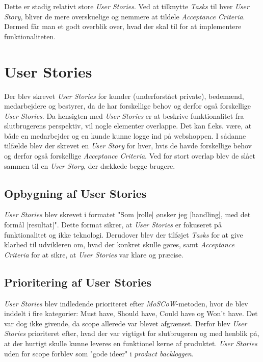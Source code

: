 Dette er stadig relativt store \emph{User Stories}. Ved at tilknytte \emph{Tasks} til hver \emph{User Story}, bliver de mere overskuelige og 
nemmere at tildele \emph{Acceptance Criteria}. Dermed får man et godt overblik over, hvad der skal til for at implementere funktionaliteten.

\section{User Stories}
Der blev skrevet \emph{User Stories} for kunder (underforstået private), bedemænd, medarbejdere og bestyrer, da de har forskellige behov og derfor også forskellige \emph{User Stories}.
Da hensigten med \emph{User Stories} er at beskrive funktionalitet fra slutbrugerens perspektiv, vil nogle elementer overlappe. Det kan f.eks. være, at både en medarbejder og en kunde kunne logge ind på webshoppen.
I sådanne tilfælde blev der skrevet en \emph{User Story} for hver, hvis de havde forskellige behov og derfor også forskellige \emph{Acceptance Criteria}.
Ved for stort overlap blev de slået sammen til en \emph{User Story}, der dækkede begge brugere.

\subsection{Opbygning af User Stories}
\emph{User Stories} blev skrevet i formatet "Som [rolle] ønsker jeg [handling], med det formål [resultat]".
Dette format sikrer, at \emph{User Stories} er fokuseret på funktionalitet og ikke teknologi.
Derudover blev der tilføjet \emph{Tasks} for at give klarhed til udvikleren om, hvad der konkret skulle gøres, samt \emph{Acceptance Criteria} for at sikre, at \emph{User Stories} var klare og præcise.

\subsection{Prioritering af User Stories}
\emph{User Stories} blev indledende prioriteret efter \emph{MoSCoW}-metoden, hvor de blev inddelt i fire kategorier: Must have, Should have, Could have og Won't have.
Det var dog ikke givende, da scope allerede var blevet afgrænset. Derfor blev \emph{User Stories} prioriteret efter, hvad der var vigtigst for slutbrugeren og med henblik på, at der hurtigt skulle kunne leveres en funktionel kerne af produktet.
\emph{User Stories} uden for scope forblev som "gode ideer" i \emph{product backloggen}.

